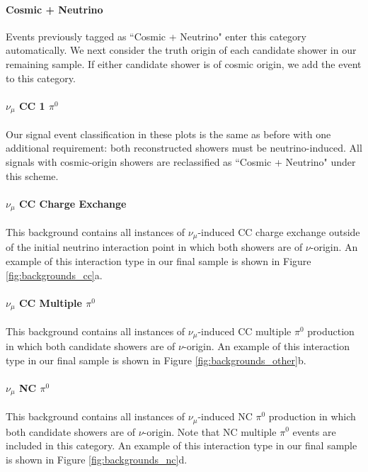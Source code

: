 \paragraph{ Cosmic + Neutrino}
Events previously tagged as ``Cosmic + Neutrino" enter this category automatically.  We next consider the truth origin of each candidate shower in our remaining sample.  If either candidate shower is of cosmic origin, we add the event to this category. %

\paragraph{ $\nu_\mu$ CC 1 $\pi^0$ } Our signal event classification in these plots is the same as before with one additional requirement: both reconstructed showers must be neutrino-induced.  All signals with cosmic-origin showers are reclassified as ``Cosmic + Neutrino" under this scheme.

\paragraph{$\nu_\mu$ CC Charge Exchange}
This background contains all instances of $\nu_\mu$-induced CC charge exchange outside of the initial neutrino interaction point in which both showers are of $\nu$-origin. An example of this interaction type in our final sample is shown in Figure \ref{fig:backgrounds_cc}a. 

\paragraph{$\nu_\mu$ CC Multiple $\pi^0$}
This background contains all instances of $\nu_\mu$-induced CC multiple $\pi^0$ production in which both candidate showers are of $\nu$-origin.  An example of this interaction type in our final sample is shown in Figure \ref{fig:backgrounds_other}b.

\paragraph{$\nu_\mu$ NC $\pi^0$}
This background contains all instances of $\nu_\mu$-induced NC $\pi^0$ production in which both candidate showers are of $\nu$-origin. Note that NC multiple $\pi^0$ events are included in this category.  An example of this interaction type in our final sample is shown in Figure \ref{fig:backgrounds_nc}d. 


